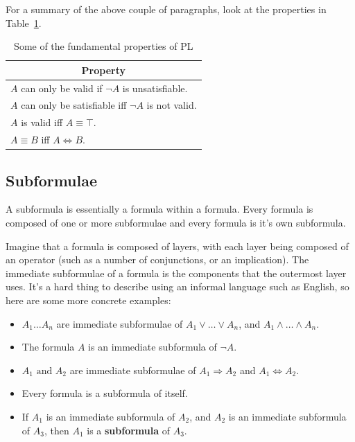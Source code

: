 For a summary of the above couple of paragraphs, look at the properties in
Table~\ref{table:PL-laws}.


\begin{table}[!h]
  \centering
  \begin{tabular}{l}
    \multicolumn{1}{c}{\textbf{Property}}\\ \hline
    $A$ can only be valid if $\neg A$ is unsatisfiable.\\
    $A$ can only be satisfiable iff $\neg A$ is not valid.\\
    $A$ is valid iff $A \equiv \top$.\\
    $A \equiv B$ iff $A \Leftrightarrow B$.
  \end{tabular}
  \label{table:PL-laws}
  \caption{Some of the fundamental properties of PL}
\end{table}

\subsection{Subformulae}

A subformula is essentially a formula within a formula. Every formula is
composed of one or more subformulae and every formula is it's own subformula.

Imagine that a formula is composed of layers, with each layer being composed of
an operator (such as a number of conjunctions, or an implication). The immediate
subformulae of a formula is the components that the outermost layer uses. It's a
hard thing to describe using an informal language such as English, so here are
some more concrete examples:

\begin{itemize}
  \item $A_1 \dots A_n$ are immediate subformulae of
        $A_1 \vee \dots \vee A_n$, and $A_1 \wedge \dots \wedge A_n$.
  \item The formula $A$ is an immediate subformula of $\neg A$.
  \item $A_1\text{~and~}A_2$ are immediate subformulae of $A_1 \Rightarrow A_2$
        and $A_1 \Leftrightarrow A_2$.
  \item Every formula is a subformula of itself.
  \item If $A_1$ is an immediate subformula of $A_2$, and $A_2$ is an immediate
  subformula of $A_3$, then $A_1$ is a \textbf{subformula} of $A_3$.
\end{itemize}

